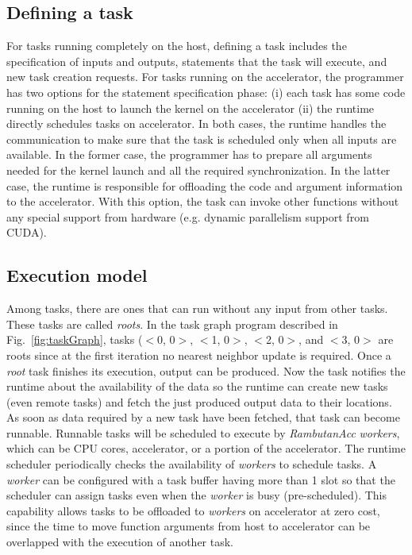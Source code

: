 \subsection{Defining a task}
For tasks running completely on the host, defining a task includes the specification of inputs and outputs, statements that the task will execute, and new task creation requests.
For tasks running on the accelerator, the programmer has two options for the statement specification phase: (i) each task has some code running on the host to launch the kernel on the accelerator (ii) the runtime directly schedules tasks on accelerator.
In both cases, the runtime handles the communication to make sure that the task is scheduled only when all inputs are available.
In the former case, the programmer has to prepare all arguments needed for the kernel launch and all the required synchronization.
In the latter case, the runtime is responsible for offloading the code and argument information to the accelerator.
With this option, the task can invoke other functions without any special support from hardware (e.g. dynamic parallelism support from CUDA).


\subsection{Execution model}
Among tasks, there are ones that can run without any input from other tasks.
These tasks are called {\em roots}.
In the task graph program described in Fig.~\ref{fig:taskGraph}, tasks ($<$0, 0$>$, $<$1, 0$>$, $<$2, 0$>$, and $<$3, 0$>$ are roots since at the first iteration no nearest neighbor update is required.
Once a {\em root} task finishes its execution, output can be produced.
Now the task notifies the runtime about the availability of the data so the runtime can create new tasks (even remote tasks) and fetch the just produced output data to their locations.
As soon as data required by a new task have been fetched, that task can become runnable.
Runnable tasks will be scheduled to execute by {\em RambutanAcc} {\em workers}, which can be CPU cores, accelerator, or a portion of the accelerator.
The runtime scheduler periodically checks the availability of {\em workers} to schedule tasks. 
A {\em worker} can be configured with a task buffer having more than 1 slot so that the scheduler can assign tasks even when the {\em worker} is busy (pre-scheduled). 
This capability allows tasks to be offloaded to {\em workers} on accelerator at zero cost, since the time to move function arguments from host to accelerator can be overlapped with the execution of another task.

